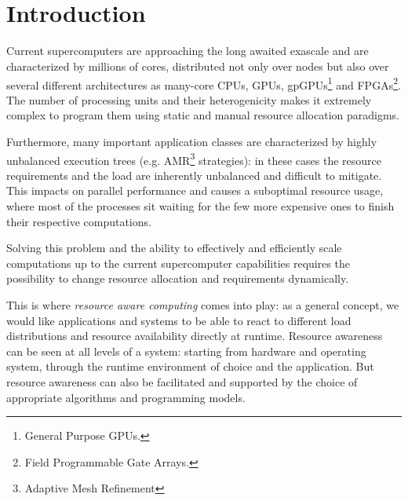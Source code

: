 
~\\~
\section{Introduction}

Current supercomputers are approaching the long awaited exascale and are characterized by millions of cores, distributed not only over nodes but also over several different architectures as many-core CPUs, GPUs, gpGPUs\footnote{General Purpose GPUs.} and FPGAs\footnote{Field Programmable Gate Arrays.}.
The number of processing units and their heterogenicity makes it extremely complex to program them using static and manual resource allocation paradigms.

Furthermore, many important application classes are characterized by highly unbalanced execution trees (e.g. AMR\footnote{Adaptive Mesh Refinement} strategies): in these cases the resource requirements and the load are inherently unbalanced and difficult to mitigate.
This impacts on parallel performance and causes a suboptimal resource usage, where most of the processes sit waiting for the few more expensive ones to finish their respective computations.

Solving this problem and the ability to effectively and efficiently scale computations up to the current supercomputer capabilities requires the possibility to change resource allocation and requirements dynamically.

This is where \emph{resource aware computing} comes into play: as a general concept, we would like applications and systems to be able to react to different load distributions and resource availability directly at runtime. Resource awareness can be seen at all levels of a system: starting from hardware and operating system, through the runtime environment of choice and the application. But resource awareness can also be facilitated and supported by the choice of appropriate algorithms and programming models.

